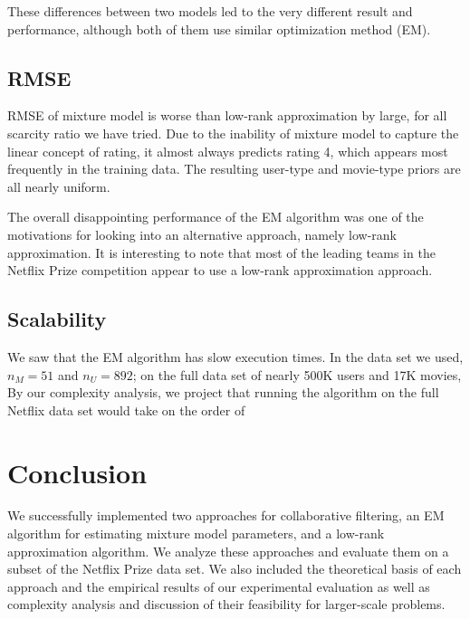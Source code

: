 \documentclass{article}
\begin{document}
These differences between two models led to the very different result and performance, although both of them use similar optimization method (EM).


\subsection{RMSE}
RMSE of mixture model is worse than low-rank approximation by large, for all scarcity ratio we have tried. Due to the inability of mixture model to capture the linear concept of rating, it almost always predicts rating 4, which appears most frequently in the training data. The resulting user-type and movie-type priors are all nearly uniform.

The overall disappointing performance of the EM algorithm was one of the motivations for looking into an alternative approach, namely low-rank approximation. It is interesting to note that most of the leading teams in the Netflix Prize competition appear to use a low-rank approximation
approach.




\subsection{Scalability}

We saw that the EM algorithm has slow execution times. In the data set
we used, $n_M = 51$ and $n_U = 892$; on the full data set of nearly
500K users and 17K movies, By our complexity analysis, we project that
running the algorithm on the full Netflix data set would take on the
order of \TODO{}

\section{Conclusion}


We successfully implemented two approaches for collaborative
filtering, an EM algorithm for estimating mixture model parameters,
and a low-rank approximation algorithm.  We analyze these approaches
and evaluate them on a subset of the Netflix Prize data set. We also
included the theoretical basis of each approach and the empirical
results of our experimental evaluation as well as complexity analysis
and discussion of their feasibility for larger-scale problems.
\end{document}
